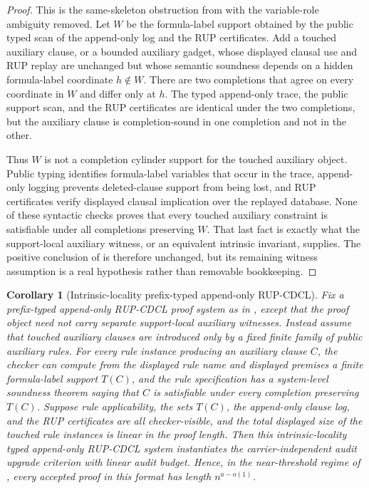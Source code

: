\documentclass[11pt]{article}
\newtheorem{corollary}[theorem]{Corollary}
\theoremstyle{definition}
\begin{document}
\begin{proof}
This is the same-skeleton obstruction from
with the variable-role ambiguity removed.  Let \(W\) be the formula-label
support obtained by the public typed scan of the append-only log and the RUP
certificates.  Add a touched auxiliary clause, or a bounded auxiliary gadget,
whose displayed clausal use and RUP replay are unchanged but whose semantic
soundness depends on a hidden formula-label coordinate \(h\notin W\).  There
are two completions that agree on every coordinate in \(W\) and differ only at
\(h\).  The typed append-only trace, the public support scan, and the RUP
certificates are identical under the two completions, but the auxiliary clause
is completion-sound in one completion and not in the other.

Thus \(W\) is not a completion cylinder support for the touched auxiliary
object.  Public typing identifies formula-label variables that occur in the
trace, append-only logging prevents deleted-clause support from being lost, and
RUP certificates verify displayed clausal implication over the replayed
database.  None of these syntactic checks proves that every touched auxiliary
constraint is satisfiable under all completions preserving \(W\).  That last
fact is exactly what the support-local auxiliary witness, or an equivalent
intrinsic invariant, supplies.  The positive conclusion of
 is therefore unchanged, but its
remaining witness assumption is a real hypothesis rather than removable
bookkeeping.
\end{proof}

\begin{corollary}[Intrinsic-locality prefix-typed append-only RUP-CDCL]\label{cor:intrinsic-locality-prefix-typed-rup-cdcl}
Fix a prefix-typed append-only RUP-CDCL proof system as in
, except that the proof object need
not carry separate support-local auxiliary witnesses.  Instead assume that
touched auxiliary clauses are introduced only by a fixed finite family of
public auxiliary rules.  For every rule instance producing an auxiliary clause
\(C\), the checker can compute from the displayed rule name and displayed
premises a finite formula-label support \(T(C)\), and the rule specification
has a system-level soundness theorem saying that \(C\) is satisfiable under
every completion preserving \(T(C)\).  Suppose rule applicability, the sets
\(T(C)\), the append-only clause log, and the RUP certificates are all
checker-visible, and the total displayed size of the touched rule instances is
linear in the proof length.  Then this intrinsic-locality typed append-only
RUP-CDCL system instantiates the carrier-independent audit upgrade criterion
with linear audit budget.  Hence, in the near-threshold regime of
, every accepted proof in this format has length
\(n^{a-o(1)}\).
\end{corollary}
\end{document}
